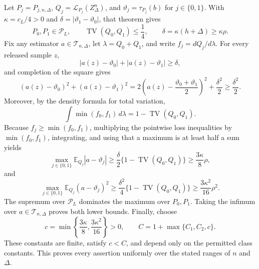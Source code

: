 Let \(P_j=P_{j,n,\Delta}\), \(Q_j=\mathcal L_{P_j}(Z_\Delta^n)\), and \(\vartheta_j=\tau_{P_j}(b)\) for \(j\in\{0,1\}\).  With \(\kappa=c_L/4>0\) and \(\delta=|\vartheta_1-\vartheta_0|\), that theorem gives
\[
 P_0,P_1\in\mathcal P_L,
 \qquad \operatorname{TV}(Q_0,Q_1)\leq\frac14,
 \qquad \delta=\kappa(h+\Delta)\geq\kappa\rho.
\]
Fix any estimator \(a\in\mathcal T_{n,\Delta}\), let \(\lambda=Q_0+Q_1\), and write \(f_j=dQ_j/d\lambda\).  For every released sample \(z\),
\[
 |a(z)-\vartheta_0|+|a(z)-\vartheta_1|\geq\delta,
\]
and completion of the square gives
\[
 (a(z)-\vartheta_0)^2+(a(z)-\vartheta_1)^2
 =2\left(a(z)-\frac{\vartheta_0+\vartheta_1}{2}\right)^2+\frac{\delta^2}{2}
 \geq\frac{\delta^2}{2}.
\]
Moreover, by the density formula for total variation,
\[
 \int\min(f_0,f_1)\,d\lambda
 =1-\operatorname{TV}(Q_0,Q_1).
\]
Because \(f_j\geq\min(f_0,f_1)\), multiplying the pointwise loss inequalities by \(\min(f_0,f_1)\), integrating, and using that a maximum is at least half a sum yields
\[
 \max_{j\in\{0,1\}}\mathbb E_{Q_j}|a-\vartheta_j|
 \geq\frac\delta2\{1-\operatorname{TV}(Q_0,Q_1)\}
 \geq\frac{3\kappa}{8}\rho,
\]
and
\[
 \max_{j\in\{0,1\}}\mathbb E_{Q_j}(a-\vartheta_j)^2
 \geq\frac{\delta^2}{4}\{1-\operatorname{TV}(Q_0,Q_1)\}
 \geq\frac{3\kappa^2}{16}\rho^2.
\]
The supremum over \(\mathcal P_L\) dominates the maximum over \(P_0,P_1\).  Taking the infimum over \(a\in\mathcal T_{n,\Delta}\) proves both lower bounds.  Finally, choose
\[
 c=\min\left\{\frac{3\kappa}{8},\frac{3\kappa^2}{16}\right\}>0,
 \qquad
 C=1+\max\{C_1,C_2,c\}.
\]
These constants are finite, satisfy \(c<C\), and depend only on the permitted class constants.  This proves every assertion uniformly over the stated ranges of \(n\) and \(\Delta\).